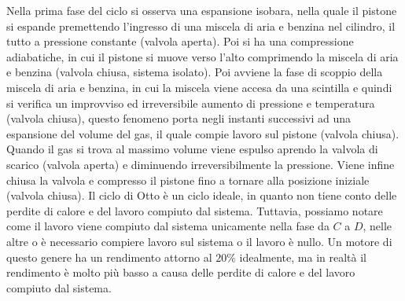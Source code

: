         Nella prima fase del ciclo si osserva una espansione isobara, nella quale il pistone si espande premettendo l'ingresso di una miscela di aria e benzina nel cilindro, il tutto a pressione constante (valvola aperta). Poi si ha una compressione adiabatiche, in cui il pistone si muove verso l'alto comprimendo la miscela di aria e benzina (valvola chiusa, sistema isolato). Poi avviene la fase di scoppio della miscela di aria e benzina, in cui la miscela viene accesa da una scintilla e quindi si verifica un improvviso ed irreversibile aumento di pressione e temperatura (valvola chiusa), questo fenomeno porta negli instanti successivi ad una espansione del volume del gas, il quale compie lavoro sul pistone (valvola chiusa). Quando il gas si trova al massimo volume viene espulso aprendo la valvola di scarico (valvola aperta) e diminuendo irreversibilmente la pressione. Viene infine chiusa la valvola e compresso il pistone fino a tornare alla posizione iniziale (valvola chiusa). \newline
        Il ciclo di Otto è un ciclo ideale, in quanto non tiene conto delle perdite di calore e del lavoro compiuto dal sistema. Tuttavia, possiamo notare come il lavoro viene compiuto dal sistema unicamente nella fase da $C$ a $D$, nelle altre o è necessario compiere lavoro sul sistema o il lavoro è nullo. Un motore di questo genere ha un rendimento attorno al $20\%$ idealmente, ma in realtà il rendimento è molto più basso a causa delle perdite di calore e del lavoro compiuto dal sistema. 
